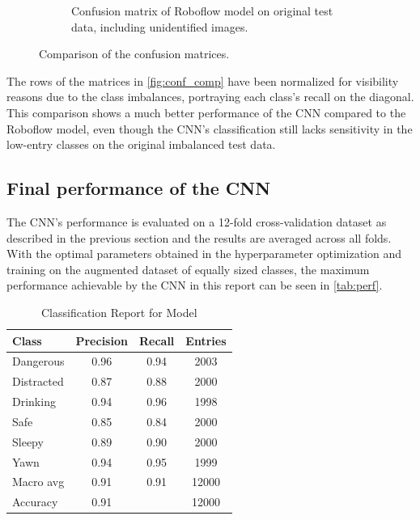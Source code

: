 \begin{figure}[H]
\begin{subfigure}{0.49\textwidth}
        \caption{Confusion matrix of Roboflow model on original test data, including unidentified images.}
    \end{subfigure}
    \caption{Comparison of the confusion matrices.}
    \label{fig:conf_comp}
\end{figure}
\noindent
The rows of the matrices in \autoref{fig:conf_comp} have been normalized for visibility reasons due to the class imbalances, portraying each class's recall on the diagonal.
This comparison shows a much better performance of the CNN compared to the Roboflow model, even though the CNN's classification still lacks sensitivity in the low-entry classes on the original imbalanced test data. 
\subsection{Final performance of the CNN}
The CNN's performance is evaluated on a 12-fold cross-validation dataset as described in the previous section and the results are averaged across all folds. With the optimal parameters obtained in the hyperparameter optimization and training on the augmented dataset of equally sized classes, the maximum performance achievable by the CNN in this report can be seen in \autoref{tab:perf}.
\begin{table}[H]
    \centering
    \caption{Classification Report for Model}
    \vspace{3pt}
    \label{tab:perf}
    \begin{adjustbox}{max width=\textwidth}
    \begin{tabular}{l|cc|c}
        \toprule
        \textbf{Class} & \textbf{Precision} & \textbf{Recall} & \textbf{Entries} \\
        \midrule
 Dangerous & 0.96 & 0.94 & 2003 \\
 Distracted & 0.87 & 0.88 & 2000 \\
 Drinking & 0.94 & 0.96 & 1998 \\
 Safe & 0.85 & 0.84 & 2000 \\
 Sleepy & 0.89 & 0.90 & 2000 \\
 Yawn & 0.94 & 0.95 & 1999 \\
        \midrule
 Macro avg & 0.91 & 0.91& 12000 \\
 Accuracy & 0.91 & \phantom{0} & 12000 \\
        \bottomrule
    \end{tabular}
    \end{adjustbox}
\end{table}
\noindent
